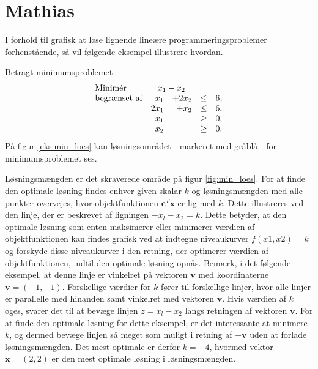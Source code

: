 \section{Mathias}

I forhold til grafisk at løse lignende lineære programmeringsproblemer forhenstående, så vil følgende eksempel illustrere hvordan. 

\begin{eks}
\label{eks:min_loes}
Betragt minimumsproblemet
%
\begin{align*}
\begin{array}{lrrlr}
\text{Minimér}		&	\multicolumn{2}{c}{x_1-x_2}  &\\
\text{begrænset af}	&x_1& + 2x_2			&\leq 	& 6,\\
					&2x_1& + x_2			&\leq	& 6,\\
					&x_1&    				&\geq	& 0,\\
					&x_2&    				&\geq	& 0.\\
\end{array}
\end{align*}
%
På figur \ref{eks:min_loes} kan løsningsområdet - markeret med gråblå - for minimumsproblemet ses.
%

%
\end{eks}
\noindent
Løsningsmængden er det skraverede område på figur \ref{fig:min_loes}. For at finde den optimale løsning findes enhver given skalar $k$ og løsningsmængden med alle punkter overvejes, hvor objektfunktionen $\textbf{c}^T\textbf{x}$ er lig med $k$. Dette illustreres ved den linje, der er beskrevet af ligningen $-x_l-x_2=k$. Dette betyder, at den optimale løsning som enten maksimerer eller minimerer værdien
af objektfunktionen kan findes grafisk ved at indtegne niveaukurver $f(x1, x2)=k$ og forskyde disse niveaukurver i den retning, der optimerer værdien af objektfunktionen, indtil den optimale løsning opnås.  Bemærk, i det følgende eksempel, at denne linje er vinkelret på vektoren $\textbf{v}$ med koordinaterne $\textbf{v}=(-1,-1)$.
Forskellige værdier for $k$ fører til forskellige linjer, hvor  alle linjer er parallelle med hinanden samt vinkelret med vektoren $\textbf{v}$. Hvis værdien af $k$ øges, svarer det til at bevæge linjen $z=x_l-x_2$ langs retningen af vektoren $\textbf{v}$. For at finde den optimale løsning for dette eksempel, er det interessante at minimere $k$, og dermed bevæge linjen så meget som muligt i retning af $-\textbf{v}$ uden at forlade løsningsmængden. Det mest optimale er derfor $k = -4$, hvormed vektor $\textbf{x}=(2,2)$ er den mest optimale løsning i løsningsmængden. 